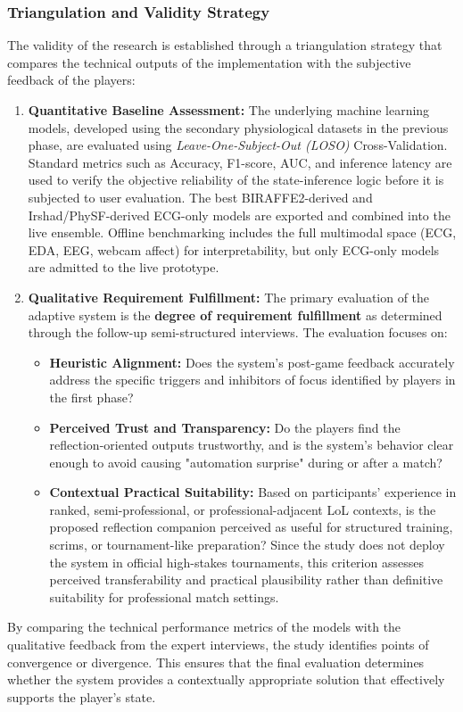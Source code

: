 \subsubsection{Triangulation and Validity Strategy}
The validity of the research is established through a triangulation strategy that compares the technical outputs of the implementation with the subjective feedback of the players:

\begin{enumerate}
    \item \textbf{Quantitative Baseline Assessment:} The underlying machine learning models, developed using the secondary physiological datasets in the previous phase, are evaluated using \textit{Leave-One-Subject-Out (LOSO)} Cross-Validation. Standard metrics such as Accuracy, F1-score, AUC, and inference latency are used to verify the objective reliability of the state-inference logic before it is subjected to user evaluation. The best BIRAFFE2-derived and Irshad/PhySF-derived ECG-only models are exported and combined into the live ensemble. Offline benchmarking includes the full multimodal space (ECG, EDA, EEG, webcam affect) for interpretability, but only ECG-only models are admitted to the live prototype.

    \item \textbf{Qualitative Requirement Fulfillment:} The primary evaluation of the adaptive system is the \textbf{degree of requirement fulfillment} as determined through the follow-up semi-structured interviews. The evaluation focuses on:
    \begin{itemize}
        \item \textbf{Heuristic Alignment:} Does the system's post-game feedback accurately address the specific triggers and inhibitors of focus identified by players in the first phase?
        \item \textbf{Perceived Trust and Transparency:} Do the players find the reflection-oriented outputs trustworthy, and is the system's behavior clear enough to avoid causing "automation surprise" during or after a match?
        \item \textbf{Contextual Practical Suitability:} Based on participants' experience in ranked, semi-professional, or professional-adjacent LoL contexts, is the proposed reflection companion perceived as useful for structured training, scrims, or tournament-like preparation? Since the study does not deploy the system in official high-stakes tournaments, this criterion assesses perceived transferability and practical plausibility rather than definitive suitability for professional match settings.
    \end{itemize}
\end{enumerate}

By comparing the technical performance metrics of the models with the qualitative feedback from the expert interviews, the study identifies points of convergence or divergence. This ensures that the final evaluation determines whether the system provides a contextually appropriate solution that effectively supports the player's state.